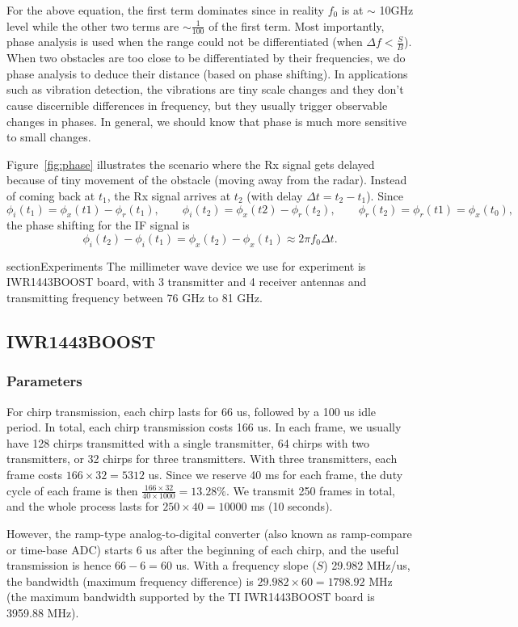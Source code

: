 \documentclass[11pt, oneside]{article}   	%
\begin{document}
For the above equation, the first term dominates since in reality $f_0$ is at $\sim$ 10GHz level while the other two terms are $\sim \frac{1}{100}$ of the first term. Most importantly, phase analysis is used when the range could not be differentiated (when $\Delta f < \frac{S}{B}$). When two obstacles are too close to be differentiated by their frequencies, we do phase analysis to deduce their distance (based on  phase shifting). In applications such as vibration detection, the vibrations are tiny scale changes and they don't cause discernible differences in frequency, but they usually trigger observable changes in phases. In general, we should know that phase is much more sensitive to small changes.

Figure~\ref{fig:phase} illustrates the scenario where the Rx signal gets delayed because of tiny movement of the obstacle (moving away from the radar). Instead of coming back at $t_1$, the Rx signal arrives at $t_2$ (with delay $\Delta t = t_2 - t_1$).  Since
$$\phi_i(t_1) = \phi_x(t1) - \phi_r(t_1), \qquad \phi_i(t_2) = \phi_x(t2) - \phi_r(t_2), \qquad \phi_r(t_2) = \phi_r(t1) = \phi_x(t_0),$$
the phase shifting for the IF signal is
$$\phi_i(t_2)-\phi_i(t_1) = \phi_x(t_2) - \phi_x(t_1) \approx 2\pi f_0 \Delta t.$$

section{Experiments}
The millimeter wave device we use for experiment is IWR1443BOOST board, with 3 transmitter and 4 receiver antennas and transmitting frequency between 76 GHz to 81 GHz.

\subsection{IWR1443BOOST}
\subsubsection{Parameters}
For chirp transmission, each chirp lasts for 66 us, followed by a 100 us idle period. In total, each chirp transmission costs 166 us. In each frame, we usually have 128 chirps transmitted with a single transmitter, 64 chirps with two transmitters, or 32 chirps for three transmitters. With three transmitters, each frame costs $166\times 32 = 5312$ us. Since we reserve 40 ms for each frame, the duty cycle of each frame is then $\frac{166\times 32}{40\times 1000} = 13.28\%.$ We transmit 250 frames in total, and the whole process lasts for $250 \times 40 = 10000$ ms (10 seconds).

However, the ramp-type analog-to-digital converter (also known as ramp-compare or time-base ADC) starts 6 us after the beginning of each chirp, and the useful transmission is hence $66 - 6 = 60$ us. With a frequency slope ($S$) 29.982 MHz/us, the bandwidth (maximum frequency difference) is $29.982 \times 60 = 1798.92$ MHz (the maximum bandwidth supported by the TI IWR1443BOOST board is 3959.88 MHz).
\end{document}
